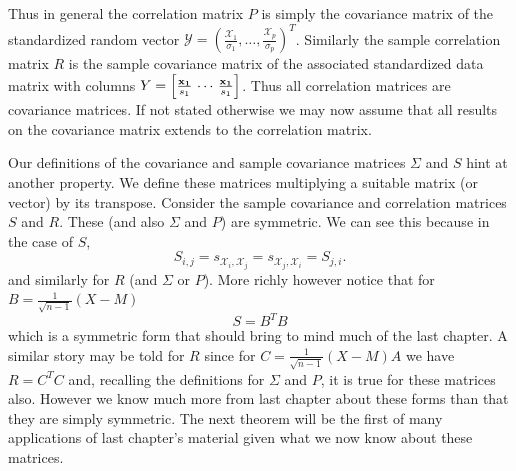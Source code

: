 \documentclass{book}
\newcommand{\bs}[1]{\boldsymbol{#1}}
\newcommand{\rv}[1]{\bs{\mathscr{#1}}}
\begin{document}
Thus in general the correlation matrix $P$ is simply the covariance matrix of the standardized random vector $\rv{Y}=\left(\frac{\mathscr{X}_1}{\sigma_1},\ldots,\frac{\mathscr{X}_p}{\sigma_p}\right)^T$. Similarly the sample correlation matrix $R$ is the sample covariance matrix of the associated standardized data matrix with columns $Y=\left[\frac{{\bf x_1}}{s_1}\,\cdots\,\frac{{\bf x_1}}{s_1}\right]$. Thus all correlation matrices are covariance matrices. If not stated otherwise we may now assume that all results on the covariance matrix extends to the correlation matrix.

Our definitions of the covariance and sample covariance matrices $\Sigma$ and $S$ hint at another property. We define these matrices multiplying a suitable matrix (or vector) by its transpose. Consider the sample covariance and correlation matrices $S$ and $R$. These (and also $\Sigma$ and $P$) are symmetric. We can see this because in the case of $S$,
$$
S_{i,j}=s_{\mathscr{X}_i,\mathscr{X}_j}=s_{\mathscr{X}_j,\mathscr{X}_i}=S_{j,i}.
$$
and similarly for $R$ (and $\Sigma$ or $P$). More richly however notice that for $B=\frac{1}{\sqrt{n-1}}(X-M)$ 
$$
S=B^TB
$$
which is a symmetric form that should bring to mind much of the last chapter. A similar story may be told for $R$ since for $C=\frac{1}{\sqrt{n-1}}(X-M)A$ we have $R=C^TC$ and, recalling the definitions for $\Sigma$ and $P$, it is true for these matrices also. However we know much more from last chapter about these forms than that they are simply symmetric. The next theorem will be the first of many applications of last chapter's material given what we now know about these matrices.
\end{document}
